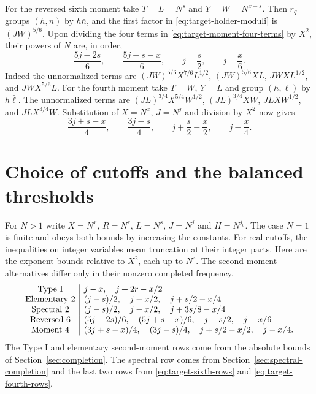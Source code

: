 \documentclass[11pt]{amsart}
\numberwithin{equation}{section}
\theoremstyle{remark}
\begin{document}
For the reversed sixth moment take \(T=L=N^s\) and
\(Y=W=N^{x-s}\). Then \(r_q\) groups \((h,n)\) by \(h\bar n\), and
the first factor in \eqref{eq:target-holder-moduli} is
\((JW)^{5/6}\). Upon dividing the four terms in
\eqref{eq:target-moment-four-terms} by \(X^2\), their powers of \(N\)
are, in order,
\begin{equation}
 \frac{5j-2s}{6},\qquad
 \frac{5j+s-x}{6},\qquad
 j-\frac{s}{2},\qquad
 j-\frac{x}{6}.
 \label{eq:target-sixth-rows}
\end{equation}
Indeed the unnormalized terms are
\((JW)^{5/6}X^{7/6}L^{1/2}\), \((JW)^{5/6}XL\),
\(JWX L^{1/2}\), and \(JWX^{5/6}L\).
For the fourth moment take \(T=W\), \(Y=L\) and group \((h,\ell)\) by
\(h\bar\ell\). The unnormalized terms are
\((JL)^{3/4}X^{5/4}W^{1/2}\), \((JL)^{3/4}XW\),
\(JLXW^{1/2}\), and \(JLX^{3/4}W\). Substitution of \(X=N^x\),
\(J=N^j\) and division by \(X^2\) now gives
\begin{equation}
 \frac{3j+s-x}{4},\qquad
 \frac{3j-s}{4},\qquad
 j+\frac{s}{2}-\frac{x}{2},\qquad
 j-\frac{x}{4}.
 \label{eq:target-fourth-rows}
\end{equation}

\section{Choice of cutoffs and the balanced thresholds}
\label{sec:exponents}

For \(N>1\) write \(X=N^x\), \(R=N^r\), \(L=N^s\), \(J=N^j\) and
\(H=N^{j_0}\). The case \(N=1\) is finite and obeys both bounds by
increasing the constants. For real cutoffs, the inequalities on
integer variables mean truncation at their integer parts. Here are
the exponent bounds relative to \(X^2\), each up to \(N^\varepsilon\).
The second-moment alternatives differ only in their nonzero
completed frequency.
\begin{equation}\label{eq:row-ledger}
\begin{array}{@{}c|l@{}}
 \text{Type I} & j-x,\quad j+2r-x/2\\
 \text{Elementary }2 & (j-s)/2,\quad j-x/2,\quad j+s/2-x/4\\
 \text{Spectral }2 & (j-s)/2,\quad j-x/2,\quad j+3s/8-x/4\\
 \text{Reversed }6 &
  (5j-2s)/6,\quad (5j+s-x)/6,\quad j-s/2,\quad j-x/6\\
 \text{Moment }4 &
  (3j+s-x)/4,\quad(3j-s)/4,\quad j+s/2-x/2,\quad j-x/4.
\end{array}
\end{equation}
The Type I and elementary second-moment rows come from the absolute
bounds of Section~\ref{sec:completion}. The spectral row comes from
Section~\ref{sec:spectral-completion} and the last two rows from
\eqref{eq:target-sixth-rows} and \eqref{eq:target-fourth-rows}.
\end{document}

